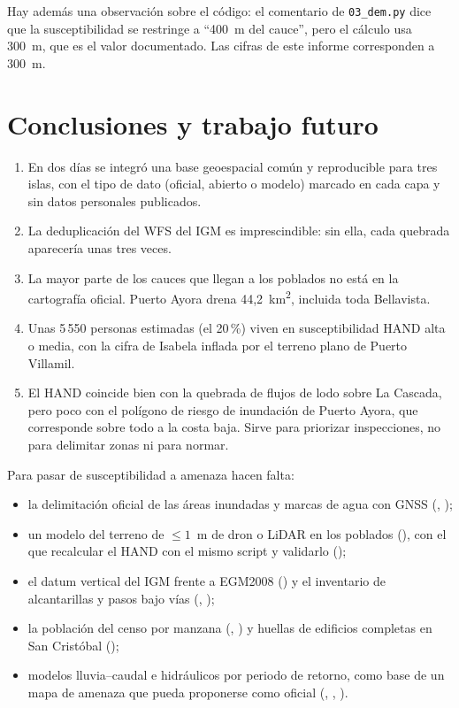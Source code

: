 \documentclass{sosg-informe}
\newcommand{\kmc}{km\textsuperscript{2}}
\begin{document}
Hay además una observación sobre el código: el comentario de \texttt{03\_dem.py} dice que la susceptibilidad se restringe a \enquote{400~m del cauce}, pero el cálculo usa 300~m, que es el valor documentado. Las cifras de este informe corresponden a 300~m.

\section{Conclusiones y trabajo futuro}
\begin{enumerate}
  \item En dos días se integró una base geoespacial común y reproducible para tres islas, con el tipo de dato (oficial, abierto o modelo) marcado en cada capa y sin datos personales publicados.
  \item La deduplicación del WFS del IGM es imprescindible: sin ella, cada quebrada aparecería unas tres veces.
  \item La mayor parte de los cauces que llegan a los poblados no está en la cartografía oficial. Puerto Ayora drena 44,2~\kmc, incluida toda Bellavista.
  \item Unas 5\,550 personas estimadas (el 20\,\%) viven en susceptibilidad HAND alta o media, con la cifra de Isabela inflada por el terreno plano de Puerto Villamil.
  \item El HAND coincide bien con la quebrada de flujos de lodo sobre La Cascada, pero poco con el polígono de riesgo de inundación de Puerto Ayora, que corresponde sobre todo a la costa baja. Sirve para priorizar inspecciones, no para delimitar zonas ni para normar.
\end{enumerate}

Para pasar de susceptibilidad a amenaza hacen falta:
\begin{itemize}
  \item la delimitación oficial de las áreas inundadas y marcas de agua con GNSS (, );
  \item un modelo del terreno de $\leq 1$~m de dron o LiDAR en los poblados (), con el que recalcular el HAND con el mismo script y validarlo ();
  \item el datum vertical del IGM frente a EGM2008 () y el inventario de alcantarillas y pasos bajo vías (, );
  \item la población del censo por manzana (, ) y huellas de edificios completas en San Cristóbal ();
  \item modelos lluvia--caudal e hidráulicos por periodo de retorno, como base de un mapa de amenaza que pueda proponerse como oficial (, , ).
\end{itemize}
\end{document}
